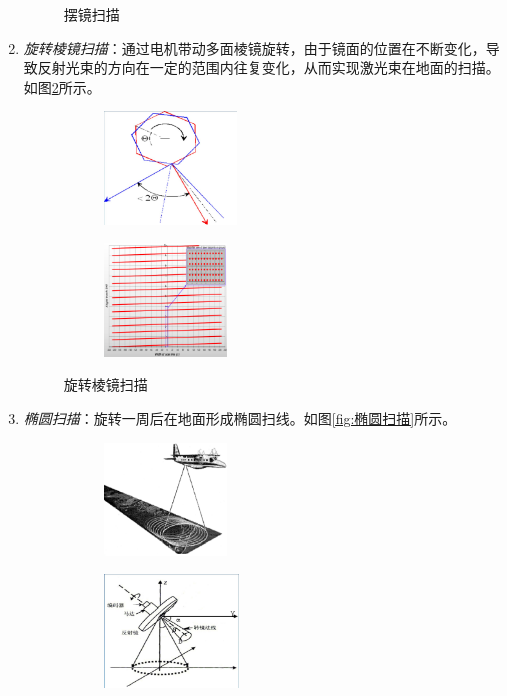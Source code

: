 \begin{enumerate}
\begin{figure}[htbp]
			\caption{摆镜扫描}
			\label{fig:摆镜扫描}
		\end{figure}
	\item \textit{旋转棱镜扫描}：通过电机带动多面棱镜旋转，由于镜面的位置在不断变化，导致反射光束的方向在一定的范围内往复变化，从而实现激光束在地面的扫描。如图\ref{fig:旋转棱镜扫描}所示。
		\begin{figure}[htbp]
			\centering
			\begin{subfigure}[t]{0.45\linewidth}
				\centering
				\includegraphics[height=3cm]{figure/Chapter3/旋转棱镜扫描原理}
			\end{subfigure}
			\begin{subfigure}[t]{0.45\linewidth}
				\centering
				\includegraphics[height=3cm]{figure/Chapter3/旋转棱镜扫描脚点形状}
			\end{subfigure}
			\caption{旋转棱镜扫描}
			\label{fig:旋转棱镜扫描}
		\end{figure}
	\item \textit{椭圆扫描}：旋转一周后在地面形成椭圆扫线。如图\ref{fig:椭圆扫描}所示。
		\begin{figure}[htbp]
			\centering
			\begin{subfigure}[t]{0.3\linewidth}
				\centering
				\includegraphics[height=3cm]{figure/Chapter3/椭圆扫描1}
			\end{subfigure}
			\begin{subfigure}[t]{0.3\linewidth}
				\centering
				\includegraphics[height=3cm]{figure/Chapter3/椭圆扫描2}

\end{subfigure}
\end{figure}
\end{enumerate}
